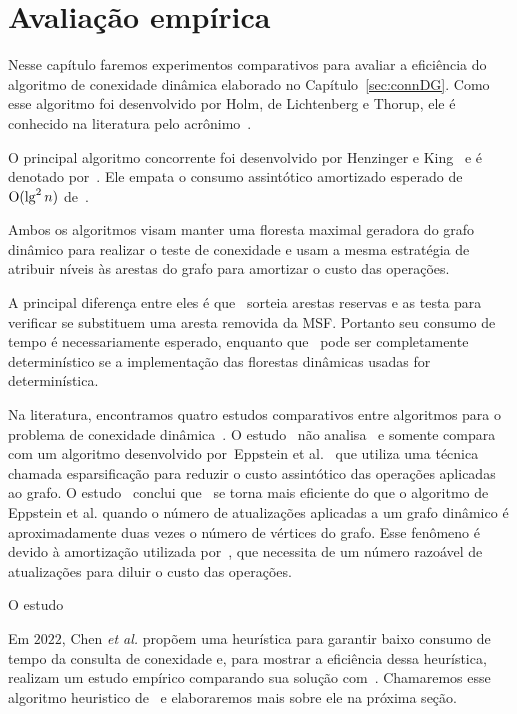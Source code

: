 \chapter{Avaliação empírica}
\label{sec:avaliacao-empirica}

Nesse capítulo faremos experimentos comparativos para avaliar a eficiência do algoritmo de conexidade dinâmica elaborado no Capítulo~\ref{sec:connDG}. Como esse algoritmo foi desenvolvido  por Holm, de Lichtenberg e Thorup, ele é conhecido na literatura pelo acrônimo~\HDT.

O principal algoritmo concorrente foi desenvolvido por Henzinger e King~\cite{HenzingerKing} e é denotado por~\HK.
Ele empata o consumo assintótico amortizado esperado de $\mathrm{O}(\lg^2 n)$ de~\HDT.

Ambos os algoritmos visam manter uma floresta maximal geradora do grafo dinâmico para realizar o teste de conexidade e usam a mesma estratégia de atribuir níveis às arestas do grafo para amortizar o custo das operações.

A principal diferença entre eles é que~\HK{} sorteia arestas reservas e as testa para verificar se substituem uma aresta removida da MSF. Portanto seu consumo de tempo é necessariamente esperado, enquanto que~\HDT{} pode ser completamente determinístico se a implementação das florestas dinâmicas usadas for determinística. 

Na literatura, encontramos quatro estudos comparativos entre algoritmos para o problema de conexidade dinâmica~\cite{EmpiricalStudy1997, EmpiricalStudy2002, Zaroliagis2002, QC22}.
O estudo~\cite{EmpiricalStudy1997} não analisa~\HDT{} e somente compara~\HK{} com um algoritmo desenvolvido por~Eppstein et al.~\cite{Eppstein1992SparsificationaTF} que utiliza uma técnica chamada esparsificação para reduzir o custo assintótico das operações aplicadas ao grafo.
O estudo~\cite{EmpiricalStudy1997} conclui que~\HK{} se torna mais eficiente do que o algoritmo de Eppstein et al. quando o número de atualizações aplicadas a um grafo dinâmico é aproximadamente duas vezes o número de vértices do grafo. Esse fenômeno é devido à amortização utilizada por~\HK{}, que necessita de um número razoável de atualizações para diluir o custo das operações. 



O estudo~\cite{EmpiricalStudy2002}

Em $2022$, Chen \textit{et al.}\cite{QC22} propõem uma heurística para garantir baixo consumo de tempo da consulta de conexidade e, para mostrar a eficiência dessa heurística, realizam um estudo empírico comparando sua solução com~\HK{}.
Chamaremos esse algoritmo heuristico de~\CLHB{} e elaboraremos mais sobre ele na próxima seção.

